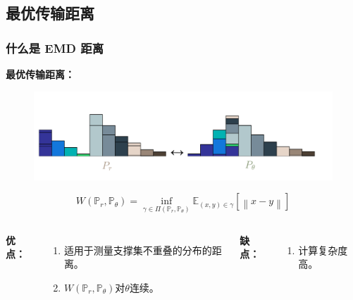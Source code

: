 \documentclass[xelatex]{beamer}
\begin{document}
\subsection{最优传输距离}
\begin{frame}
\frametitle{什么是 EMD 距离}
\textbf{最优传输距离：}
\begin{figure}
  \includegraphics[width=0.65\linewidth]{EMD}
\end{figure}
$$
\mathit{W}(\mathbb{P}_r , \mathbb{P}_\theta) = \inf_{\gamma \in \Pi(\mathbb{P}_r, \mathbb{P}_\theta) }\mathbb{E}_{(x,y) \in \gamma }  \left [ \left \| x - y \right \| \right ]
$$
\begin{columns}[t]
  \textbf{优点：}
    \begin{enumerate}
      \item 适用于测量支撑集不重叠的分布的距离。
      \item $\mathit{W}(\mathbb{P}_r , \mathbb{P}_\theta)$对$\theta$连续。
    \end{enumerate}
  \textbf{缺点：}
    \begin{enumerate}
      \item 计算复杂度高。
    \end{enumerate}
\end{columns}
\end{frame}
\end{document}
